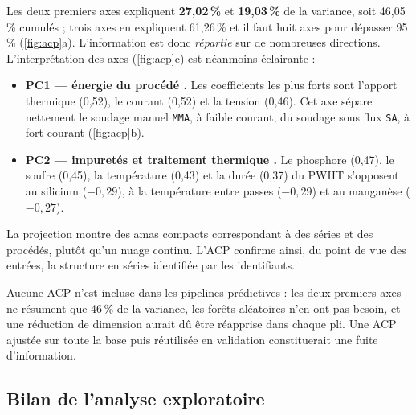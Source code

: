 Les deux premiers axes expliquent \textbf{27,02\,\%} et \textbf{19,03\,\%} de la
variance, soit 46,05\,\% cumulés ; trois axes en expliquent 61,26\,\% et il faut
huit axes pour dépasser 95\,\% (\cref{fig:acp}a). L'information est donc
\emph{répartie} sur de nombreuses directions. L'interprétation des axes
(\cref{fig:acp}c) est néanmoins éclairante :
\begin{itemize}
  \item \textbf{PC1 --- \og énergie du procédé \fg{}.} Les coefficients les plus forts sont l'apport thermique (0,52), le courant (0,52) et la tension (0,46). Cet axe sépare nettement le soudage manuel \texttt{MMA}, à faible courant, du soudage sous flux \texttt{SA}, à fort courant (\cref{fig:acp}b).
  \item \textbf{PC2 --- \og impuretés et traitement thermique \fg{}.} Le phosphore (0,47), le soufre (0,45), la température (0,43) et la durée (0,37) du PWHT s'opposent au silicium ($-0{,}29$), à la température entre passes ($-0{,}29$) et au manganèse ($-0{,}27$).
\end{itemize}
La projection montre des amas compacts correspondant à des séries et des procédés,
plutôt qu'un nuage continu. L'ACP confirme ainsi, du point de vue des entrées,
la structure en séries identifiée par les identifiants.

\begin{decision}
Aucune ACP n'est incluse dans les pipelines prédictives : les deux premiers axes
ne résument que 46\,\% de la variance, les forêts aléatoires n'en ont pas besoin,
et une réduction de dimension aurait dû être réapprise dans chaque pli. Une ACP
ajustée sur toute la base puis réutilisée en validation constituerait une fuite
d'information.
\end{decision}

\subsection{Bilan de l'analyse exploratoire}

